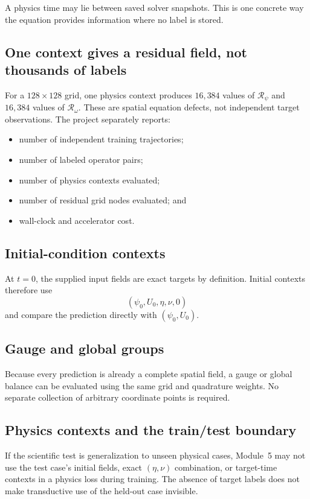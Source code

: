 \documentclass[11pt]{article}
\newcommand{\Rpsi}{\mathcal{R}_{\psi}}
\newcommand{\Romega}{\mathcal{R}_{\omega}}
\begin{document}
A physics time may lie between saved solver snapshots. This is one concrete way the equation provides information where no label is stored.

\subsection{One context gives a residual field, not thousands of labels}
For a $128\times128$ grid, one physics context produces $16{,}384$ values of $\Rpsi$ and $16{,}384$ values of $\Romega$. These are spatial equation defects, not independent target observations. The project separately reports:
\begin{itemize}
  \item number of independent training trajectories;
  \item number of labeled operator pairs;
  \item number of physics contexts evaluated;
  \item number of residual grid nodes evaluated; and
  \item wall-clock and accelerator cost.
\end{itemize}

\subsection{Initial-condition contexts}
At $t=0$, the supplied input fields are exact targets by definition. Initial contexts therefore use
\begin{equation}
(\psi_0,U_0,\eta,\nu,0)
\end{equation}
and compare the prediction directly with $(\psi_0,U_0)$.

\subsection{Gauge and global groups}
Because every prediction is already a complete spatial field, a gauge or global balance can be evaluated using the same grid and quadrature weights. No separate collection of arbitrary coordinate points is required.

\subsection{Physics contexts and the train/test boundary}
\begin{warningbox}
If the scientific test is generalization to unseen physical cases, Module~5 may not use the test case's initial fields, exact $(\eta,\nu)$ combination, or target-time contexts in a physics loss during training. The absence of target labels does not make transductive use of the held-out case invisible.
\end{warningbox}
\end{document}
